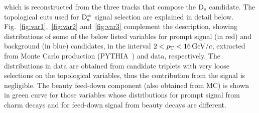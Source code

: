 which is reconstructed from the three tracks that compose the ${\rm D_s}$
candidate. The topological cuts used for ${\rm D_s^{\pm}}$ signal selection
 are explained in detail below. Fig.~\ref{fig:var1},~\ref{fig:var2} and~\ref{fig:var3} complement
 the description, showing distributions of some of the below listed variables
 for prompt signal (in red) and background (in blue) candidates, in the interval $2 < p_{\rm T} < 16 \, \mathrm{GeV}/c$, 
 extracted from Monte Carlo production (PYTHIA~\cite{Sjostrand:2006za}) and data, respectively.
 The distributions in data are obtained from candidate triplets with very loose
 selections on the topological variables, thus the contribution from the signal is negligible.
 The beauty feed-down component (also obtained from MC) is shown
 in green curve for those variables whose distributions for prompt signal
 from charm decays and for feed-down signal from beauty decays are different.
 
